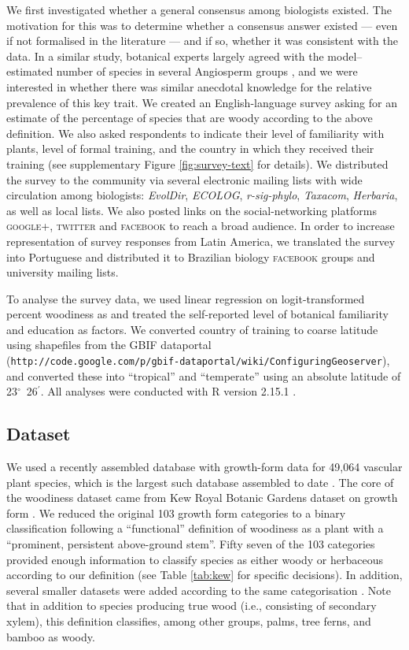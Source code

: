\documentclass[a4paper,12pt]{article}
\begin{document}
We first investigated whether a general consensus among biologists
existed.  The motivation for this was to determine whether a consensus
answer existed --- even if not formalised in the literature --- and if
so, whether it was consistent with the data.
% 
In a similar study, botanical experts largely agreed with the
model--estimated number of species in several Angiosperm groups
\citep{joppa2010}, and we were interested in whether there was similar
anecdotal knowledge for the relative prevalence of this key trait.
%
We created an English-language survey asking for an estimate of the
percentage of species that are woody according to the above
definition.  We also asked respondents to indicate their level of
familiarity with plants, level of formal training, and the country in
which they received their training (see supplementary Figure
\ref{fig:survey-text} for details).
%
We distributed the survey to the community via several electronic
mailing lists with wide circulation among biologists: \emph{EvolDir},
\emph{ECOLOG}, \emph{\mbox{r-sig-phylo}}, \emph{Taxacom},
\emph{Herbaria}, as well as local lists. We also posted links on the
social-networking platforms \textsc{google+}, \textsc{twitter} and
\textsc{facebook} to reach a broad audience.
%
In order to increase representation of survey responses from Latin
America, we translated the survey into Portuguese and distributed it
to Brazilian biology \textsc{facebook} groups and university mailing
lists.

To analyse the survey data, we used linear regression on
logit-transformed percent woodiness as \citep[see][]{wartonarcsine}
and treated the self-reported level of botanical familiarity and
education as factors.  We converted country of training to coarse
latitude using shapefiles
from the GBIF dataportal\\
(\texttt{http://code.google.com/p/gbif-dataportal/wiki/ConfiguringGeoserver}),
and converted these into ``tropical'' and ``temperate'' using an
absolute latitude of 23$^\circ$~26$^\prime$.  All analyses were
conducted with R version 2.15.1 \citep{R}.

\subsection{Dataset}

We used a recently assembled database with growth-form data for 49,064
vascular plant species, which is the largest such database assembled
to date \citep[see][]{Zanne}. The core of the woodiness dataset came
from Kew Royal Botanic Gardens dataset on growth form \citep{Kew}.  We
reduced the original 103 growth form categories to a binary
classification following a ``functional'' definition of woodiness as a
plant with a ``prominent, persistent above-ground stem''.  Fifty seven
of the 103 categories provided enough information to classify species
as either woody or herbaceous according to our definition (see Table
\ref{tab:kew} for specific decisions).  In addition, several smaller
datasets were added according to the same categorisation
\citep{Zanne}.  Note that in addition to species producing true wood
(i.e., consisting of secondary xylem), this definition classifies,
among other groups, palms, tree ferns, and bamboo as woody.
\end{document}
